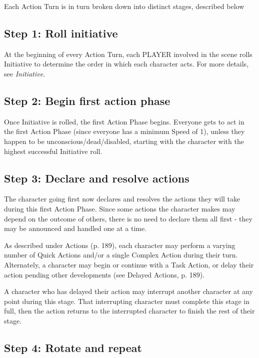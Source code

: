 Each Action Turn is in turn broken down into distinct stages, described below


\subsection{Step 1: Roll initiative}
\label{sec:roll-initiative}

At the beginning of every Action Turn, each PLAYER involved in the scene rolls Initiative to determine the order in which each character acts. For more details, see \emph{Initiative}.


\subsection{Step 2: Begin first action phase}
\label{sec:begin-first-phase}

Once Initiative is rolled, the first Action Phase begins. Everyone gets to act in the first Action Phase (since everyone has a minimum Speed of 1), unless they happen to be unconscious/dead/disabled, starting with the character with the highest successful Initiative roll.


\subsection{Step 3: Declare and resolve actions}
\label{sec:declare-resolve}

The character going first now declares and resolves the actions they will take during this first Action Phase. Since some actions the character makes may depend on the outcome of others, there is no need to declare them all first - they may be announced and handled one at a time.

As described under Actions (p. 189), each character may perform a varying number of Quick Actions and/or a single Complex Action during their turn. Alternately, a character may begin or continue with a Task Action, or delay their action pending other developments (see Delayed Actions, p. 189).

A character who has delayed their action may interrupt another character at any point during this stage. That interrupting character must complete this stage in full, then the action returns to the interrupted character to finish the rest of their stage.


\subsection{Step 4: Rotate and repeat}
\label{sec:rotate-repeat}

